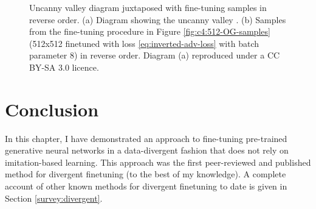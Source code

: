 \begin{figure}[!htbp]
  \centering
  \hfill
  \caption[Uncanny valley diagram juxtaposed with samples from fine-tuning process]{Uncanny valley diagram juxtaposed with fine-tuning samples in reverse order. (a) Diagram showing the uncanny valley \citep{mori1970uncanny}. (b) Samples from the fine-tuning procedure in Figure \ref{fig:c4:512-OG-samples} (512x512 finetuned with loss \ref{eq:inverted-adv-loss} with batch parameter 8) in reverse order. Diagram (a) reproduced under a CC BY-SA 3.0 licence. }
  \label{fig:c4:uncanny-valley-comparison}
\end{figure}

\section{Conclusion}

In this chapter, I have demonstrated an approach to fine-tuning pre-trained generative neural networks in a data-divergent fashion that does not rely on imitation-based learning.
This approach was the first peer-reviewed and published method for divergent finetuning (to the best of my knowledge).
A complete account of other known methods for divergent finetuning to date is given in Section \ref{survey:divergent}.

